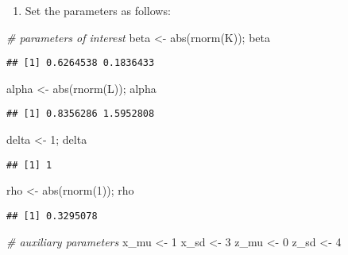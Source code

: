 \documentclass[
]{article}
\newenvironment{Shaded}{\begin{snugshade}}{\end{snugshade}}
\newcommand{\CommentTok}[1]{\textcolor[rgb]{0.56,0.35,0.01}{\textit{#1}}}
\newcommand{\DecValTok}[1]{\textcolor[rgb]{0.00,0.00,0.81}{#1}}
\newcommand{\FunctionTok}[1]{\textcolor[rgb]{0.00,0.00,0.00}{#1}}
\newcommand{\NormalTok}[1]{#1}
\newcommand{\OtherTok}[1]{\textcolor[rgb]{0.56,0.35,0.01}{#1}}
\providecommand{\tightlist}{%
  \setlength{\itemsep}{0pt}\setlength{\parskip}{0pt}}
\begin{document}
\begin{enumerate}
\def\labelenumi{\arabic{enumi}.}
\setcounter{enumi}{1}
\tightlist
\item
  Set the parameters as follows:
\end{enumerate}

\begin{Shaded}
\begin{Highlighting}[]
\CommentTok{\# parameters of interest}
\NormalTok{beta }\OtherTok{\textless{}{-}} \FunctionTok{abs}\NormalTok{(}\FunctionTok{rnorm}\NormalTok{(K)); beta}
\end{Highlighting}
\end{Shaded}

\begin{verbatim}
## [1] 0.6264538 0.1836433
\end{verbatim}

\begin{Shaded}
\begin{Highlighting}[]
\NormalTok{alpha }\OtherTok{\textless{}{-}} \FunctionTok{abs}\NormalTok{(}\FunctionTok{rnorm}\NormalTok{(L)); alpha}
\end{Highlighting}
\end{Shaded}

\begin{verbatim}
## [1] 0.8356286 1.5952808
\end{verbatim}

\begin{Shaded}
\begin{Highlighting}[]
\NormalTok{delta }\OtherTok{\textless{}{-}} \DecValTok{1}\NormalTok{; delta}
\end{Highlighting}
\end{Shaded}

\begin{verbatim}
## [1] 1
\end{verbatim}

\begin{Shaded}
\begin{Highlighting}[]
\NormalTok{rho }\OtherTok{\textless{}{-}} \FunctionTok{abs}\NormalTok{(}\FunctionTok{rnorm}\NormalTok{(}\DecValTok{1}\NormalTok{)); rho}
\end{Highlighting}
\end{Shaded}

\begin{verbatim}
## [1] 0.3295078
\end{verbatim}

\begin{Shaded}
\begin{Highlighting}[]
\CommentTok{\# auxiliary parameters}
\NormalTok{x\_mu }\OtherTok{\textless{}{-}} \DecValTok{1}
\NormalTok{x\_sd }\OtherTok{\textless{}{-}} \DecValTok{3}
\NormalTok{z\_mu }\OtherTok{\textless{}{-}} \DecValTok{0}
\NormalTok{z\_sd }\OtherTok{\textless{}{-}} \DecValTok{4}
\end{Highlighting}
\end{Shaded}
\end{document}

